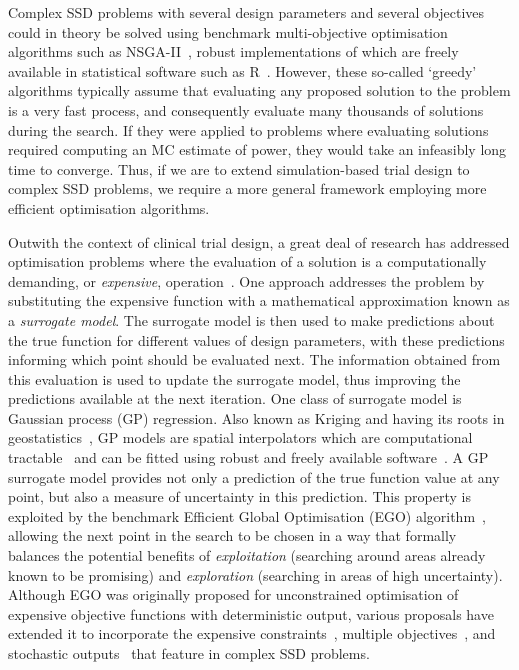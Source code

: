 \documentclass[]{sagej}
\begin{document}
Complex SSD problems with several design parameters and several objectives could in theory be solved using  benchmark multi-objective optimisation algorithms such as NSGA-II~\cite{Deb2002}, robust implementations of which are freely available in statistical software such as R~\cite{Mersmann2014}. However, these so-called `greedy' algorithms typically assume that evaluating any proposed solution to the problem is a very fast process, and consequently evaluate many thousands of solutions during the search. If they were applied to problems where evaluating solutions required computing an MC estimate of power, they would take an infeasibly long time to converge. Thus, if we are to extend simulation-based trial design to complex SSD problems, we require a more general framework employing more efficient optimisation algorithms. 


Outwith the context of clinical trial design, a great deal of research has addressed optimisation problems where the evaluation of a solution is a computationally demanding, or \emph{expensive}, operation~\cite{Sacks1989,Santner2003}. One approach addresses the problem by substituting the expensive function with a mathematical approximation known as a \emph{surrogate model}. The surrogate model is then used to make predictions about the true function for different values of design parameters, with these predictions informing which point should be evaluated next. The information obtained from this evaluation is used to update the surrogate model, thus improving the predictions available at the next iteration. One class of surrogate model is Gaussian process (GP) regression. Also known as Kriging and having its roots in geostatistics~\cite{Krige1951}, GP models are spatial interpolators which are computational tractable~\cite{Rasmussen2006} and can be fitted using robust and freely available software~\cite{Roustant2012}. A GP surrogate model provides not only a prediction of the true function value at any point, but also a measure of uncertainty in this prediction. This property is exploited by the benchmark Efficient Global Optimisation (EGO) algorithm~\cite{Jones2001}, allowing the next point in the search to be chosen in a way that formally balances the potential benefits of \emph{exploitation} (searching around areas already known to be promising) and \emph{exploration} (searching in areas of high uncertainty). Although EGO was originally proposed for unconstrained optimisation of expensive objective functions with deterministic output, various proposals have extended it to incorporate the expensive constraints~\cite{Sasena2002}, multiple objectives~\cite{Emmerich2011}, and stochastic outputs~\cite{Picheny2014} that feature in complex SSD problems.
\end{document}
